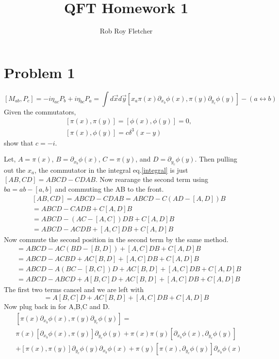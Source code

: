 \documentclass{article}
\title{QFT Homework 1}
\author{Rob Roy Fletcher}
\numberwithin{equation}{section}
\newcommand{\dxb}{\partial_{x_b}}
\newcommand{\dyc}{\partial_{y_c}}
\newcommand{\ddf}{\delta^3(x-y)}
\newcommand{\intdd}{\int d\vec{x} d\vec{y}}
\newcommand{\beq}{\begin{equation}}
\newcommand{\eeq}{\end{equation}}
\begin{document}
\section{Problem 1}

\beq \label{integral}
    [M_{ab},P_c] = -i \eta_{ac} P_b + i\eta_{bc} P_a = \intdd [x_a \pi(x) \dxb \phi(x), \pi(y) \dyc \phi(y)] - (a \leftrightarrow b)
\eeq
Given the commutators,
\beq \label{com} 
\begin{split}
    &[\pi(x), \pi(y)]=[\phi(x), \phi(y)]=0 ,\\
    &[\pi(x), \phi(y)] = c\ddf
\end{split} \eeq
show that $ c=-i$.

Let, $ A=\pi(x)$, $B=\dxb\phi(x)$, $C=\pi(y)$, and $D=\dyc\phi(y)$. Then pulling out the $x_a$, the commutator in the integral  eq.\ref{integral} is
just $[AB,CD] = ABCD - CDAB$. Now rearange the second term using $ba=ab-[a,b]$ and commuting the AB to the front.
\beq \begin{split}
    &[AB,CD]=ABCD-CDAB=ABCD - C(AD-[A,D])B\\
    &= ABCD - CADB + C[A,D]B \\
    &= ABCD - (AC-[A,C])DB + C[A,D]B \\
    &= ABCD - ACDB + [A,C]DB + C[A,D]B 
\end{split} \eeq 
Now commute the second position in the second term by the same method.
\beq \begin{split} 
   & =ABCD-AC(BD-[B,D])+[A,C]DB+C[A,D]B \\
   & = ABCD-ACBD + AC[B,D]+[A,C]DB+C[A,D]B \\
   & =ABCD-A(BC-[B,C])D+AC[B,D]+[A,C]DB+C[A,D]B \\
   & =ABCD-ABCD+A[B,C]D+AC[B,D]+[A,C]DB+C[A,D]B
\end{split} \eeq 
The first two terms cancel and we are left with
\beq
    [AB,CD]=A[B,C]D+AC[B,D]+[A,C]DB+C[A,D]B
\eeq
Now plug back in for A,B,C and D.
\beq \begin{split}
   & [\pi(x) \dxb \phi(x), \pi(y)\dyc\phi(y)] =\\
   & \pi(x)[\dxb\phi(x),\pi(y)]\dyc\phi(y) + \pi(x)\pi(y)[\dxb\phi(x),\dyc\phi(y)]\\
   & +[\pi(x),\pi(y)]\dyc\phi(y)\dxb\phi(x) + \pi(y)[\pi(x),\dyc\phi(y)]\dxb\phi(x)
\end{split} \eeq
\end{document}
